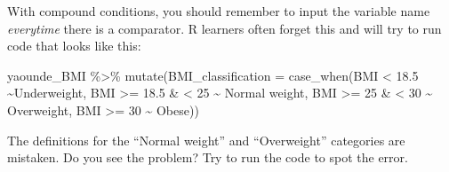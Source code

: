 \documentclass[
  letterpaper,
  DIV=11,
  numbers=noendperiod]{scrreprt}
\newenvironment{Shaded}{\begin{snugshade}}{\end{snugshade}}
\newcommand{\AttributeTok}[1]{\textcolor[rgb]{0.40,0.45,0.13}{#1}}
\newcommand{\DecValTok}[1]{\textcolor[rgb]{0.68,0.00,0.00}{#1}}
\newcommand{\ErrorTok}[1]{\textcolor[rgb]{0.68,0.00,0.00}{#1}}
\newcommand{\FloatTok}[1]{\textcolor[rgb]{0.68,0.00,0.00}{#1}}
\newcommand{\FunctionTok}[1]{\textcolor[rgb]{0.28,0.35,0.67}{#1}}
\newcommand{\NormalTok}[1]{\textcolor[rgb]{0.00,0.23,0.31}{#1}}
\newcommand{\SpecialCharTok}[1]{\textcolor[rgb]{0.37,0.37,0.37}{#1}}
\newcommand{\StringTok}[1]{\textcolor[rgb]{0.13,0.47,0.30}{#1}}
\begin{document}
\begin{tcolorbox}[enhanced jigsaw, title=\textcolor{quarto-callout-caution-color}{\faFire}\hspace{0.5em}{Watch Out}, colbacktitle=quarto-callout-caution-color!10!white, leftrule=.75mm, arc=.35mm, opacityback=0, bottomrule=.15mm, rightrule=.15mm, toptitle=1mm, breakable, toprule=.15mm, colback=white, coltitle=black, colframe=quarto-callout-caution-color-frame, bottomtitle=1mm, titlerule=0mm, left=2mm, opacitybacktitle=0.6]

With compound conditions, you should remember to input the variable name
\emph{everytime} there is a comparator. R learners often forget this and
will try to run code that looks like this:

\begin{Shaded}
\begin{Highlighting}[]
\NormalTok{yaounde\_BMI }\SpecialCharTok{\%\textgreater{}\%}
  \FunctionTok{mutate}\NormalTok{(}\AttributeTok{BMI\_classification =} \FunctionTok{case\_when}\NormalTok{(BMI }\SpecialCharTok{\textless{}} \FloatTok{18.5} \SpecialCharTok{\textasciitilde{}}\StringTok{\textquotesingle{}Underweight\textquotesingle{}}\NormalTok{,}
\NormalTok{                                        BMI }\SpecialCharTok{\textgreater{}=} \FloatTok{18.5} \SpecialCharTok{\&} \ErrorTok{\textless{}} \DecValTok{25} \SpecialCharTok{\textasciitilde{}} \StringTok{\textquotesingle{}Normal weight\textquotesingle{}}\NormalTok{,}
\NormalTok{                                        BMI }\SpecialCharTok{\textgreater{}=} \DecValTok{25} \SpecialCharTok{\&} \ErrorTok{\textless{}} \DecValTok{30} \SpecialCharTok{\textasciitilde{}} \StringTok{\textquotesingle{}Overweight\textquotesingle{}}\NormalTok{,}
\NormalTok{                                        BMI }\SpecialCharTok{\textgreater{}=} \DecValTok{30} \SpecialCharTok{\textasciitilde{}} \StringTok{\textquotesingle{}Obese\textquotesingle{}}\NormalTok{))}
\end{Highlighting}
\end{Shaded}

The definitions for the ``Normal weight'' and ``Overweight'' categories
are mistaken. Do you see the problem? Try to run the code to spot the
error.

\end{tcolorbox}
\end{document}
